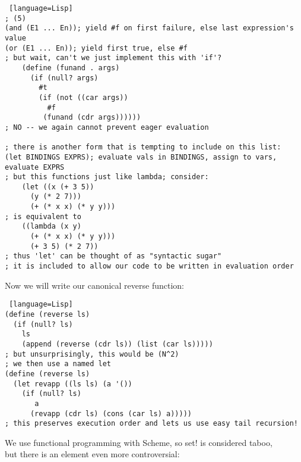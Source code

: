 \documentclass[../../lecture_notes.tex]{subfiles}
\begin{document}
\begin{lstlisting} [language=Lisp]
; (5)
(and (E1 ... En)); yield #f on first failure, else last expression's value
(or (E1 ... En)); yield first true, else #f
; but wait, can't we just implement this with 'if'?
	(define (funand . args)
	  (if (null? args)
	    #t
	    (if (not ((car args))
	      #f
	     (funand (cdr args))))))
; NO -- we again cannot prevent eager evaluation
 
; there is another form that is tempting to include on this list:
(let BINDINGS EXPRS); evaluate vals in BINDINGS, assign to vars, evaluate EXPRS
; but this functions just like lambda; consider:
	(let ((x (+ 3 5))
	  (y (* 2 7)))
	  (+ (* x x) (* y y)))
; is equivalent to
	((lambda (x y)
	  (+ (* x x) (* y y)))
	  (+ 3 5) (* 2 7))
; thus 'let' can be thought of as "syntactic sugar"
; it is included to allow our code to be written in evaluation order
\end{lstlisting}

\noindent Now we will write our canonical reverse function:
\begin{lstlisting} [language=Lisp]
(define (reverse ls)
  (if (null? ls)
    ls
    (append (reverse (cdr ls)) (list (car ls)))))
; but unsurprisingly, this would be (N^2)
; we then use a named let
(define (reverse ls)
  (let revapp ((ls ls) (a '())
    (if (null? ls)
       a
      (revapp (cdr ls) (cons (car ls) a)))))
; this preserves execution order and lets us use easy tail recursion!
\end{lstlisting}
\noindent We use functional programming with Scheme, so set! is considered taboo, \\
\indent but there is an element even more controversial:
\end{document}
